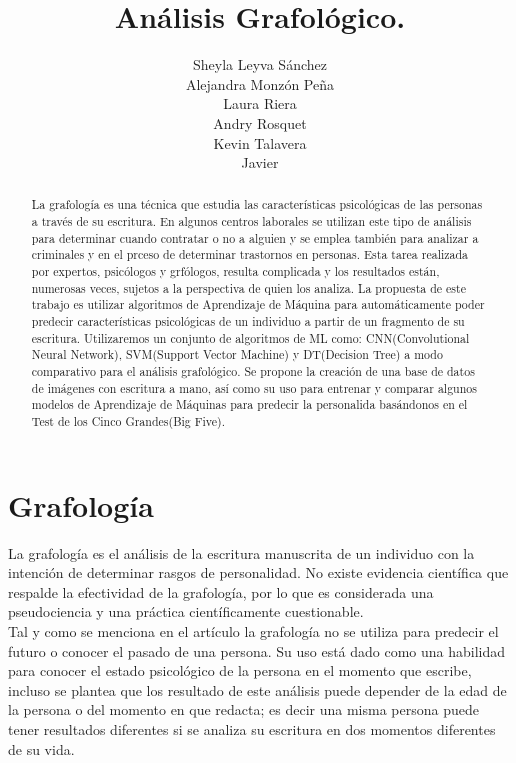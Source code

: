 \documentclass[10pt, a4paper]{article}
\begin{document}
    \title{An\'alisis Grafol\'ogico.}
    \author{Sheyla Leyva S\'anchez \\ Alejandra Monz\'on Pe\~na \\ Laura Riera \\ Andry Rosquet \\ Kevin Talavera \\ Javier}
    \date{}
    \maketitle

    \begin{abstract}
        La grafología es una técnica que estudia las características psicológicas de las personas a través de su escritura. 
        En algunos centros laborales se utilizan este tipo de análisis para determinar cuando contratar o no a alguien y se emplea también 
        para analizar a criminales y en el prceso de determinar trastornos en personas. Esta tarea realizada por expertos,
        psicólogos y grfólogos, resulta complicada y los resultados están, numerosas veces, sujetos a la perspectiva de quien los analiza. La propuesta de este trabajo es 
        utilizar algoritmos de Aprendizaje de Máquina para automáticamente poder predecir características psicológicas de un individuo a partir de un fragmento de su escritura. 
        Utilizaremos un conjunto de algoritmos de ML como: CNN(Convolutional Neural Network), SVM(Support Vector Machine) y DT(Decision Tree) a modo comparativo para el análisis grafológico. 
        Se propone la creaci\'on de una base de datos de im\'agenes con escritura a mano, as\'i como su uso para entrenar y comparar algunos modelos de Aprendizaje de M\'aquinas para predecir la personalida bas\'andonos en el Test de los Cinco Grandes(Big Five).
    \end{abstract}
    
    \section{Grafolog\'ia}
    
        La grafología es el análisis de la escritura manuscrita de un individuo con la intención de determinar rasgos de personalidad. 
        No existe evidencia científica que respalde la efectividad de la grafología, por lo que es considerada una pseudociencia 
        y una práctica científicamente cuestionable.\\ 

        Tal y como se menciona en el art\'iculo \cite{vyawahare2022graphology} la grafolog\'ia no se utiliza para predecir el futuro o conocer el pasado de una persona. Su uso 
        est\'a dado como una habilidad para conocer el estado psicol\'ogico de la persona en el momento que escribe, incluso se plantea que los resultado de este an\'alisis 
        puede depender de la edad de la persona o del momento en que redacta; es decir una misma persona puede tener resultados diferentes si se analiza su escritura en dos momentos 
        diferentes de su vida.\\
\end{document}

